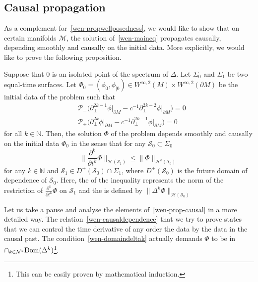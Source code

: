 \subsection{Causal propagation}\label{wen-subsect-causal}
As a complement for~\cref{wen-propwellposedness},
we would like to show that on certain manifolds $\mathcal{M}$, 
the solution of~\cref{wen-maineq} propagates causally, \ie depending smoothly and causally on the initial data.
More explicitly, 
we would like to prove the following proposition.
\begin{proposition}\label{wen-prop-causal}
Suppose that 0 is an isolated point of the spectrum of $\Delta$. 
Let $\Sigma_0$ and $\Sigma_1$ be two equal-time surfaces.
Let $\Phi_0 = (\phi_0, \phi_{|0})\in W^{\infty,2}(M)\times W^{\infty,2}(\partial M)$ be the initial data of the problem such that
\begin{equation}\label{wen-domaindeltak}
\begin{split}
& \mathcal{P}_-\big( \partial_\bot^{2k-1}\phi\vert_{\partial M} - c^{-1}\partial_\bot^{2k-2}\phi\vert_{\partial M}\big) = 0  \\
& \mathcal{P}_+\big( \partial_\bot^{2k}\phi\vert_{\partial M} - c^{-1}\partial_\bot^{2k-1}\phi\vert_{\partial M}\big) =0  
\end{split}
\end{equation}
for all $k\in\mathbb{N}$.
Then, the solution $\Phi$ of the problem depends smoothly and causally on the initial data $\Phi_0$ in the sense that for any $\mathcal{S}_0 \subset \Sigma_0$
\begin{equation}\label{wen-causaldependence}
\big\| \frac{\partial^k}{\partial t^k} \Phi\big\|_{\mathcal{H}(\mathcal{S}_1)}
\leq
\big\| \Phi\big\|_{\mathcal{H}^{k}(\mathcal{S}_0)}
\end{equation}
for any $k\in\mathbb{N}$ and $\mathcal{S}_1 \in D^+(\mathcal{S}_0)\cap\Sigma_1$, where $D^+(\mathcal{S}_0)$ is the future domain of dependence of $\mathcal{S}_0$.
Here, the \rhs of the inequality represents the norm of the restriction of $\frac{\partial^k}{\partial t^k} \Phi$ on $\mathcal{S}_1$ and the \lhs is defined by $\|\Delta^k \Phi\|_{\mathcal{H}(\mathcal{S}_0)}$  
\end{proposition}
Let us take a pause and analyse the elements of~\cref{wen-prop-causal} in a more detailed way.
The relation~\cref{wen-causaldependence} that we try to prove states that we can control the time derivative of any order the data by the data in the causal past.
The condition~\cref{wen-domaindeltak} actually demands $\Phi$ to be in $\cap_{k\in\mathcal{N}^*}\mathrm{Dom}(\Delta^k)$\footnote{
This can be easily proven by mathematical induction.
}.
